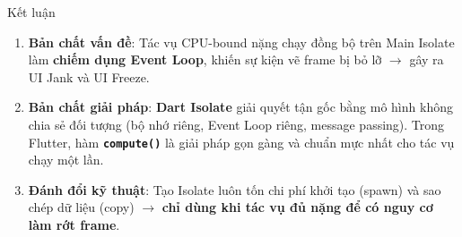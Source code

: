 \documentclass[aspectratio=169,11pt]{beamer}
\begin{document}
\begin{frame}{Kết luận}
  \vspace{0.2cm}
  \begin{enumerate}
    \setlength{\itemsep}{0.35cm}
    \item \textbf{Bản chất vấn đề}: Tác vụ CPU-bound nặng chạy đồng bộ trên Main Isolate làm \textbf{chiếm dụng Event Loop}, khiến sự kiện vẽ frame bị bỏ lỡ $\rightarrow$ gây ra UI Jank và UI Freeze.

    \item \textbf{Bản chất giải pháp}: \textbf{Dart Isolate} giải quyết tận gốc bằng mô hình không chia sẻ đối tượng (bộ nhớ riêng, Event Loop riêng, message passing). Trong Flutter, hàm \textbf{\texttt{compute()}} là giải pháp gọn gàng và chuẩn mực nhất cho tác vụ chạy một lần.

    \item \textbf{Đánh đổi kỹ thuật}: Tạo Isolate luôn tốn chi phí khởi tạo (spawn) và sao chép dữ liệu (copy) $\rightarrow$ \textbf{chỉ dùng khi tác vụ đủ nặng để có nguy cơ làm rớt frame}.
  \end{enumerate}
\end{frame}
\end{document}
